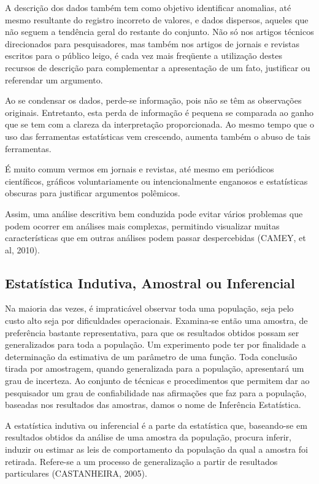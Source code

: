 A descrição dos dados também tem como objetivo identificar anomalias, até mesmo resultante do registro incorreto de valores, e dados dispersos, aqueles que não seguem a tendência geral do restante do conjunto. Não só nos artigos técnicos direcionados para pesquisadores, mas também nos artigos de jornais e revistas escritos para o público leigo, é cada vez mais freqüente a utilização destes recursos de descrição para complementar a apresentação de um fato, justificar ou referendar um argumento.\vskip0.3cm

Ao se condensar os dados, perde-se informação, pois não se têm as observações originais. Entretanto, esta perda de informação é pequena se comparada ao ganho que se tem com a clareza da interpretação proporcionada. Ao mesmo tempo que o uso das ferramentas estatísticas vem crescendo, aumenta também o abuso de tais ferramentas. \vskip0.3cm
 
É muito comum vermos em jornais e revistas, até mesmo em periódicos científicos, gráficos voluntariamente ou intencionalmente enganosos e estatísticas obscuras para justificar argumentos polêmicos. \vskip0.3cm

Assim, uma análise descritiva bem conduzida pode evitar vários problemas que podem ocorrer em análises mais complexas, permitindo  visualizar  muitas  características que  em  outras  análises  podem  passar  despercebidas (CAMEY, et al, 2010).

\subsection{Estatística Indutiva, Amostral ou Inferencial}

Na maioria das vezes, é impraticável observar toda uma população, seja pelo custo alto seja por dificuldades operacionais. Examina-se então uma amostra, de preferência bastante representativa, para que os resultados obtidos possam ser generalizados para toda a população. Um experimento pode ter por finalidade a determinação da estimativa de um parâmetro de uma função. Toda conclusão tirada por amostragem, quando generalizada para a população, apresentará um grau de incerteza. Ao conjunto de técnicas e procedimentos que permitem dar ao pesquisador um grau de confiabilidade nas afirmações que faz para a população, baseadas nos resultados das amostras, damos o nome de Inferência Estatística.\vskip0.3cm

A estatística indutiva ou inferencial é a parte da estatística que, baseando-se em resultados obtidos da análise de uma amostra da população, procura inferir, induzir ou estimar as leis de comportamento da população da qual a amostra foi retirada. Refere-se a um processo de generalização a partir de resultados particulares (CASTANHEIRA, 2005).\vskip0.3cm



